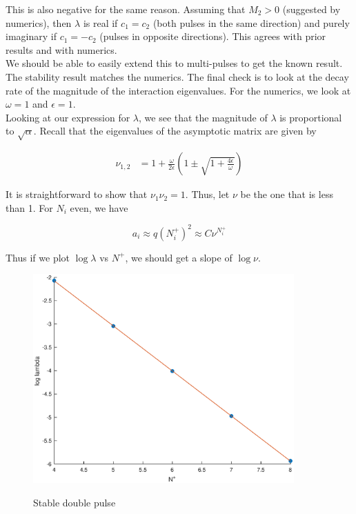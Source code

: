 \documentclass[12pt]{article}
\begin{document}
This is also negative for the same reason. Assuming that $M_2 > 0$ (suggested by numerics), then $\lambda$ is real if $c_1 = c_2$ (both pulses in the same direction) and purely imaginary if $c_1 = -c_2$ (pulses in opposite directions). This agrees with prior results and with numerics.\\

We should be able to easily extend this to multi-pulses to get the known result.\\

The stability result matches the numerics. The final check is to look at the decay rate of the magnitude of the interaction eigenvalues. For the numerics, we look at $\omega = 1$ and $\epsilon = 1$.\\

Looking at our expression for $\lambda$, we see that the magnitude of $\lambda$ is proportional to $\sqrt{\alpha}$. Recall that the eigenvalues of the asymptotic matrix are given by

\begin{align*}
\nu_{1,2} &= 1 + \frac{\omega}{2 \epsilon} \left( 1 \pm \sqrt{1 + \frac{4 \epsilon}{\omega}} \right)
\end{align*}

It is straightforward to show that $\nu_1 \nu_2 = 1$. Thus, let $\nu$ be the one that is less than 1. For $N_i$ even, we have

\[
a_i \approx q(N_i^+)^2 \approx C \nu^{N_i^+}
\] 

Thus if we plot $\log \lambda$ vs $N^+$, we should get a slope of $\log \nu$.

\begin{figure}[H]
\centering
\includegraphics[width=10cm]{dnlslog.eps}
\label{fig:essspec1}
\caption{Stable double pulse}
\end{figure}
\end{document}
